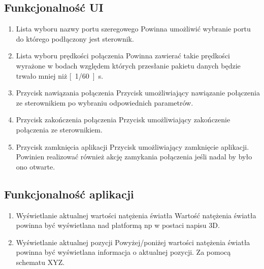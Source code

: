 \documentclass[10pt, a4paper]{article}
\begin{document}
	\subsection{Funkcjonalność UI}
		\begin{enumerate}
			\item Lista wyboru nazwy portu szeregowego
				\newline
				Powinna umożliwić wybranie portu do którego podłączony jest sterownik.
			\item Lista wyboru prędkości połączenia
				\newline
				Powinna zawierać takie prędkości wyrażone w bodach względem których przesłanie pakietu danych będzie trwało mniej niż \unit[1/60]{s}. 
			\item Przycisk nawiązania połączenia
				\newline
				Przycisk umożliwiający nawiązanie połączenia ze sterownikiem po wybraniu odpowiednich parametrów.
			\item Przycisk zakończenia połączenia
				\newline
				Przycisk umożliwiający zakończenie połączenia ze sterownikiem.
			\item Przycisk zamknięcia aplikacji
				\newline
				Przycisk umożliwiający zamknięcie aplikacji. Powinien realizować również akcję zamykania połączenia jeśli nadal by było ono otwarte.	
		\end{enumerate}
	
	\subsection{Funkcjonalność aplikacji}
		\begin{enumerate}
			\item Wyświetlanie aktualnej wartości natężenia światła
				\newline	
				Wartość natężenia światła powinna być wyświetlana nad platformą np w postaci napisu 3D.
			\item Wyświetlanie aktualnej pozycji
				\newline	
				Powyżej/poniżej wartości natężenia światła powinna być wyświetlana informacja o aktualnej pozycji. Za pomocą schematu XYZ.
		\end{enumerate}
	
\end{document}
